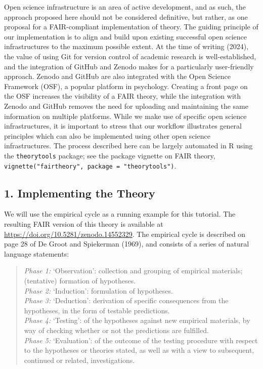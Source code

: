 \documentclass[
  man,floatsintext]{apa6}
\begin{document}
Open science infrastructure is an area of active development, and as such,
the approach proposed here should not be considered definitive,
but rather, as one proposal for a FAIR-compliant implementation of theory.
The guiding principle of our implementation is to align and build upon existing successful open science infrastructures to the maximum possible extent.
At the time of writing (2024),
the value of using Git for version control of academic research is well-established,
and the integration of GitHub and Zenodo makes for a particularly user-friendly approach.
Zenodo and GitHub are also integrated with the Open Science Framework (OSF),
a popular platform in psychology.
Creating a front page on the OSF increases the visibility of a FAIR theory,
while the integration with Zenodo and GitHub removes the need for uploading and maintaining the same information on multiple platforms.
While we make use of specific open science infrastructures, it is important to stress that our workflow illustrates general principles which can also be implemented using other open science infrastructures.
The process described here can be largely automated in R using the \texttt{theorytools} package; see the package vignette on FAIR theory, \texttt{vignette("fairtheory",\ package\ =\ "theorytools")}.

\subsection{1. Implementing the Theory}\label{implementing-the-theory}

We will use the empirical cycle as a running example for this tutorial.
The resulting FAIR version of this theory is available at \url{https://doi.org/10.5281/zenodo.14552329}.
The empirical cycle is described on page 28 of De Groot and Spiekerman (1969),
and consists of a series of natural language statements:

\begin{quote}
\emph{Phase 1:} `Observation': collection and grouping of empirical materials; (tentative) formation of hypotheses.\\
\emph{Phase 2:} `Induction': formulation of hypotheses.\\
\emph{Phase 3:} `Deduction': derivation of specific consequences from the hypotheses, in the form of testable predictions.\\
\emph{Phase 4:} `Testing': of the hypotheses against new empirical materials, by way of checking whether or not the predictions are fulfilled.\\
\emph{Phase 5:} `Evaluation': of the outcome of the testing procedure with respect to the hypotheses or theories stated, as well as with a view to subsequent, continued or related, investigations.
\end{quote}
\end{document}
